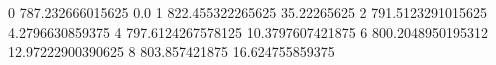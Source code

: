 0 787.232666015625 0.0
1 822.455322265625 35.22265625
2 791.5123291015625 4.2796630859375
4 797.6124267578125 10.3797607421875
6 800.2048950195312 12.97222900390625
8 803.857421875 16.624755859375
